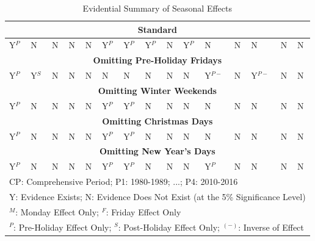 \documentclass[11pt, english]{article}
\begin{document}
\begin{table}[h]
\begin{center}
\begin{tabular}{p{0.5cm}|p{0.5cm}|p{0.5cm}|p{0.5cm}|p{0.5cm}|p{0.5cm}|p{0.5cm}|p{0.5cm}|p{0.5cm}|p{0.5cm}|p{0.5cm}|p{0.5cm}|p{0.5cm}|p{0.5cm}|p{0.5cm}}
                \hline
		\multicolumn{15}{c}{\textbf{Standard}}\\
		\hline
		Y$^P$ & N & N & N & N & Y$^P$ & Y$^P$ & Y$^P$ & N & Y$^P$ & N & N & N & N & N\\
		\hline
		\multicolumn{15}{c}{\textbf{Omitting Pre-Holiday Fridays}}\\
		\hline
		Y$^P$ & Y$^S$ & N & N & N & N & N & N & N & N & Y$^{P-}$ & N & Y$^{P-}$ & N & N\\
		\hline
		\multicolumn{15}{c}{\textbf{Omitting Winter Weekends}}\\ 
                \hline
		Y$^P$ & N & N & N & N & Y$^P$ & Y$^P$ & N & N & N & N & N & N & N & N\\
		\hline
		\multicolumn{15}{c}{\textbf{Omitting Christmas Days}}\\    
                \hline
		Y$^P$ & N & N & N & N & Y$^P$ & Y$^P$ & N & N & N & N & N & N & N & N\\
		\hline
                \multicolumn{15}{c}{\textbf{Omitting New Year's Days}}\\ 
                \hline
                Y$^P$ & N & N & N & N & Y$^P$ & Y$^P$ & N & N & N & Y$^P$ & N & N & N & N\\
		\hline
		\multicolumn{15}{l}{CP: Comprehensive Period; P1: 1980-1989; ...; P4: 2010-2016}\\
		\multicolumn{15}{l}{Y: Evidence Exists; N: Evidence Does Not Exist (at the 5\% Significance Level)}\\ 
		\multicolumn{15}{l}{$^M$: Monday Effect Only; $^F$: Friday Effect Only}\\
		\multicolumn{15}{l}{$^P$: Pre-Holiday Effect Only; $^S$: Post-Holiday Effect Only; $^{(-)}$: Inverse of Effect}\\
		\hline
	\end{tabular}
		\caption{Evidential Summary of Seasonal Effects}
	\end{center}
	\end{table}
\end{document}
